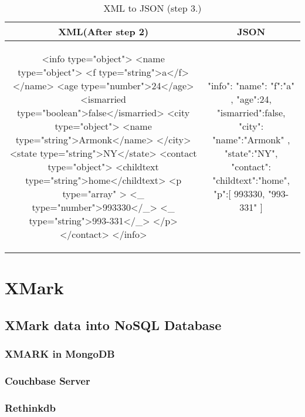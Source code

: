 	\begin{longtable}{c|c}
	\caption{XML to JSON (step 3.)}
	\label{tbl:xmljson-convert-3}\\
	\textbf{XML(After step 2)} & \textbf{JSON}\\
	\hline
\begin{minipage}{.55\textwidth}
\begin{fakeXML}
<info type="object">
  <name type="object">
    <f type="string">a</f>
  </name>
  <age type="number">24</age>
  <ismarried type="boolean">false</ismarried>
  <city type="object">
    <name type="string">Armonk</name>
  </city>
  <state type="string">NY</state>
  <contact type="object">
	<childtext type="string">home</childtext>
    <p  type="array" >
	   <_ type="number">993330</_>
	   <_ type="string">993-331</_>
    </p>
  </contact>
</info>
\end{fakeXML}	
\end{minipage} &
\begin{minipage}{.5\textwidth}
\begin{fakeJSON}
{
    "info":{
      "name":{
        "f":"a"
      },
      "age":24,
      "ismarried":false,
      "city":{
        "name":"Armonk"
      },
      "state":"NY",
      "contact":{
	   "childtext":"home",
        "p":[
          993330,
          "993-331"
        ]
      }
    }
}
\end{fakeJSON}
\end{minipage}\\
\end{longtable}
	
\section{XMark}\label{xmark}
			
		\subsection{XMark data into NoSQL Database}\label{xmark-nosql}
			
			\subsubsection{XMARK in MongoDB}\label{xmark-mongodb}
				
			\subsubsection{Couchbase Server}\label{xmark-couchbase}
				
			\subsubsection{Rethinkdb}\label{xmark-rethinkdb}
				